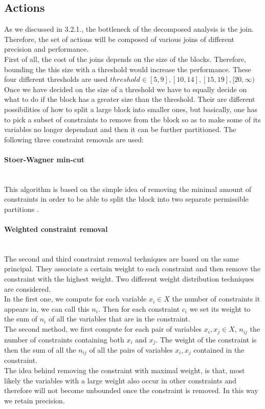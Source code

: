 \subsection{Actions}
As we discussed in 3.2.1., the bottleneck of the decomposed analysis is the join. Therefore, the set of actions will be composed of various joins of different precision and performance.\\
First of all, the cost of the joins depends on the size of the blocks. Therefore, bounding the this size with a threshold would increase the performance. These four different thresholds are used $threshold \in [5,9],[10,14],[15,19],[20,\infty)$\\
Once we have decided on the size of a threshold we have to equally decide on what to do if the block has a greater size than the threshold. Their are different possibilities of how to split a large block into smaller ones, but basically, one has to pick a subset of constraints to remove from the block so as to make some of its variables no longer dependant and then it can be further partitioned. The following three constraint removals are used:
\paragraph{Stoer-Wagner min-cut}\mbox{}\\
This algorithm is based on the simple idea of removing the minimal amount of constraints in order to be able to split the block into two separate permissible partitions \cite{stoer1997simple}.
\paragraph{Weighted constraint removal}\mbox{}\\
The second and third constraint removal techniques are based on the same principal. They associate a certain weight to each constraint and then remove the constraint with the highest weight. Two different weight distribution techniques are considered. \\
In the first one, we compute for each variable $x_i \in X$ the number of constraints it appears in, we can call this $n_i$. Then for each constraint $c_i$ we set its weight to the sum of $n_i$ of all the variables that are in the constraint.\\
The second method, we first compute for each pair of variables $x_i,x_j\in X$, $n_{ij}$ the number of constraints containing both $x_i$ and $x_j$. The weight of the constraint is then the sum of all the $n_{ij}$ of all the pairs of variables $x_i,x_j$ contained in the constraint.\\
The idea behind removing the constraint with maximal weight, is that, most likely the variables with a large weight also occur in other constraints and therefore will not become unbounded once the constraint is removed. In this way we retain precision.
